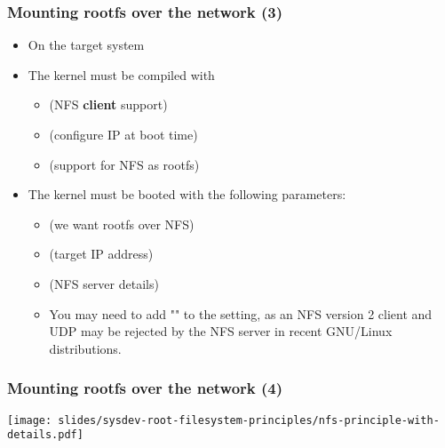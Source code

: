 {\begin{frame}
  \frametitle{Mounting rootfs over the network (3)}
  \begin{itemize}
  \item On the target system
  \item The kernel must be compiled with
    \begin{itemize}
    \item {} (NFS {\bf client} support)
    \item {} (configure IP at boot time)
    \item {} (support for NFS as rootfs)
    \end{itemize}
  \item The kernel must be booted with the following parameters:
    \begin{itemize}
    \item {} (we want rootfs over NFS)
    \item {} (target IP address)
    \item {} (NFS server details)
    \item You may need to add "" to the
       setting, as an NFS version 2 client and UDP may
      be rejected by the NFS server in recent GNU/Linux distributions.
    \end{itemize}
  \end{itemize}
\end{frame}

\begin{frame}
  \frametitle{Mounting rootfs over the network (4)}
  \begin{center}
    \texttt{[image: slides/sysdev-root-filesystem-principles/nfs-principle-with-details.pdf]}
  \end{center}
\end{frame}
}
